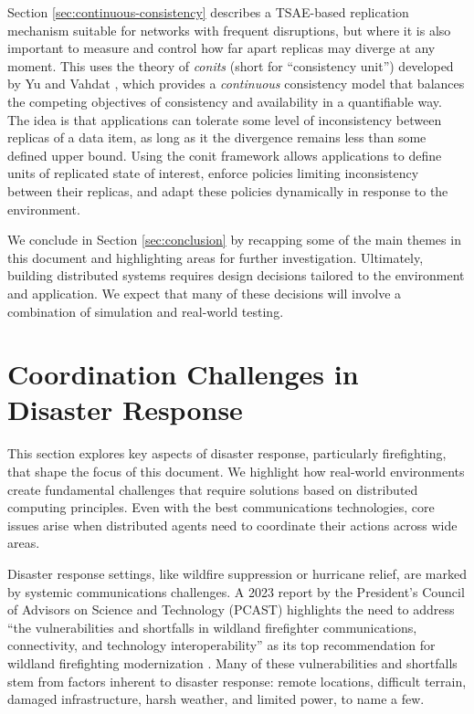 \documentclass[]             %
{NASA}                       %
\theoremstyle{definition}
\begin{document}
Section \ref{sec:continuous-consistency} describes a TSAE-based
replication mechanism suitable for networks with frequent disruptions,
but where it is also important to measure and control how far apart
replicas may diverge at any moment. This uses the theory of
\emph{conits} (short for ``consistency unit'') developed by Yu and
Vahdat \cite{2002tact}, which provides a \emph{continuous} consistency
model that balances the competing objectives of consistency and
availability in a quantifiable way. The idea is that applications can
tolerate some level of inconsistency between replicas of a data item,
as long as it the divergence remains less than some defined upper
bound. Using the conit framework allows applications to define units
of replicated state of interest, enforce policies limiting
inconsistency between their replicas, and adapt these policies
dynamically in response to the environment.

We conclude in Section \ref{sec:conclusion} by recapping some of the
main themes in this document and highlighting areas for further
investigation. Ultimately, building distributed systems requires
design decisions tailored to the environment and application. We
expect that many of these decisions will involve a combination of
simulation and real-world testing.

\section{Coordination Challenges in Disaster Response}
\label{sec:disaster-response}
This section explores key aspects of disaster response, particularly
firefighting, that shape the focus of this document. We highlight how
real-world environments create fundamental challenges that require
solutions based on distributed computing principles. Even with the
best communications technologies, core issues arise when distributed
agents need to coordinate their actions across wide areas.

Disaster response settings, like wildfire suppression or hurricane
relief, are marked by systemic communications challenges. A 2023
report by the President’s Council of Advisors on Science and
Technology (PCAST) highlights the need to address ``the
vulnerabilities and shortfalls in wildland firefighter communications,
connectivity, and technology interoperability'' as its top
recommendation for wildland firefighting modernization
\cite{pcast2023}. Many of these vulnerabilities and shortfalls stem
from factors inherent to disaster response: remote locations,
difficult terrain, damaged infrastructure, harsh weather, and limited
power, to name a few.
\end{document}
